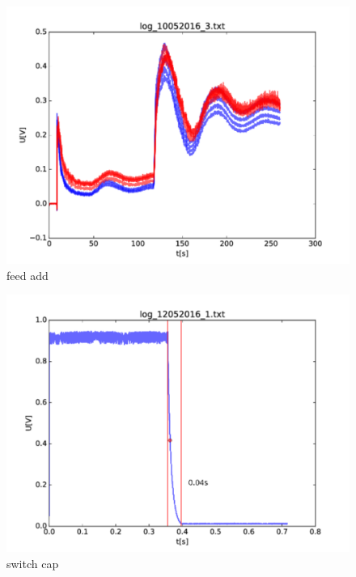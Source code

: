 \begin{figure}
	\begin{center}
		\includegraphics[width=\textwidth]{images/feed_add.pdf} 
		\caption{feed add}
	\end{center}
\end{figure}

\begin{figure}
	\begin{center}
		\includegraphics[width=\textwidth]{images/switch_cap.pdf} 
		\caption{switch cap}
	\end{center}
\end{figure}

